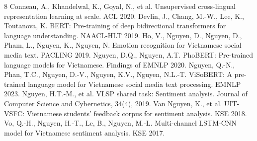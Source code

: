 \documentclass[11pt]{article}
\begin{document}
\begin{thebibliography}{8}
 Conneau, A., Khandelwal, K., Goyal, N., et al. Unsupervised cross-lingual representation learning at scale. ACL 2020.
 Devlin, J., Chang, M.-W., Lee, K., Toutanova, K. BERT: Pre-training of deep bidirectional transformers for language understanding. NAACL-HLT 2019.
 Ho, V., Nguyen, D., Nguyen, D., Pham, L., Nguyen, K., Nguyen, N. Emotion recognition for Vietnamese social media text. PACLING 2019.
 Nguyen, D.Q., Nguyen, A.T. PhoBERT: Pre-trained language models for Vietnamese. Findings of EMNLP 2020.
 Nguyen, Q.-N., Phan, T.C., Nguyen, D.-V., Nguyen, K.V., Nguyen, N.L.-T. ViSoBERT: A pre-trained language model for Vietnamese social media text processing. EMNLP 2023.
 Nguyen, H.T.-M., et al. VLSP shared task: Sentiment analysis. Journal of Computer Science and Cybernetics, 34(4), 2019.
 Van Nguyen, K., et al. UIT-VSFC: Vietnamese students' feedback corpus for sentiment analysis. KSE 2018.
 Vo, Q.-H., Nguyen, H.-T., Le, B., Nguyen, M.-L. Multi-channel LSTM-CNN model for Vietnamese sentiment analysis. KSE 2017.
\end{thebibliography}
\end{document}
